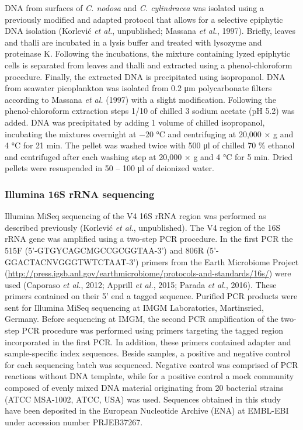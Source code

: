 \documentclass[12pt,]{article}
\begin{document}
DNA from surfaces of \emph{C. nodosa} and \emph{C. cylindracea} was
isolated using a previously modified and adapted protocol that allows
for a selective epiphytic DNA isolation (Korlević \emph{et al.},
unpublished; Massana \emph{et al.}, 1997). Briefly, leaves and thalli
are incubated in a lysis buffer and treated with lysozyme and proteinase
K. Following the incubations, the mixture containing lyzed epiphytic
cells is separated from leaves and thalli and extracted using a
phenol-chloroform procedure. Finally, the extracted DNA is precipitated
using isopropanol. DNA from seawater picoplankton was isolated from 0.2
\si{\um} polycarbonate filters according to Massana \emph{et al.} (1997)
with a slight modification. Following the phenol-chloroform extraction
steps 1/10 of chilled 3 \si{\Molar} sodium acetate (pH 5.2) was added.
DNA was precipitated by adding 1 volume of chilled isopropanol,
incubating the mixtures overnight at \num{-20} \si{\degreeCelsius} and
centrifuging at 20,000 × g and 4 \si{\degreeCelsius} for 21
\si{\minute}. The pellet was washed twice with 500 \si{\ul} of chilled
70 \si{\percent} ethanol and centrifuged after each washing step at
20,000 × g and 4 \si{\degreeCelsius} for 5 \si{\minute}. Dried pellets
were resuspended in 50 -- 100 \si{\ul} of deionized water.

\hypertarget{illumina-16s-rrna-sequencing}{%
\subsubsection{Illumina 16S rRNA
sequencing}\label{illumina-16s-rrna-sequencing}}

Illumina MiSeq sequencing of the V4 16S rRNA region was performed as
described previously (Korlević \emph{et al.}, unpublished). The V4
region of the 16S rRNA gene was amplified using a two-step PCR
procedure. In the first PCR the 515F (5'-GTGYCAGCMGCCGCGGTAA-3') and
806R (5'-GGACTACNVGGGTWTCTAAT-3') primers from the Earth Microbiome
Project
(\url{http://press.igsb.anl.gov/earthmicrobiome/protocols-and-standards/16s/})
were used (Caporaso \emph{et al.}, 2012; Apprill \emph{et al.}, 2015;
Parada \emph{et al.}, 2016). These primers contained on their 5' end a
tagged sequence. Purified PCR products were sent for Illumina MiSeq
sequencing at IMGM Laboratories, Martinsried, Germany. Before sequencing
at IMGM, the second PCR amplification of the two-step PCR procedure was
performed using primers targeting the tagged region incorporated in the
first PCR. In addition, these primers contained adapter and
sample-specific index sequences. Beside samples, a positive and negative
control for each sequencing batch was sequenced. Negative control was
comprised of PCR reactions without DNA template, while for a positive
control a mock community composed of evenly mixed DNA material
originating from 20 bacterial strains (ATCC MSA-1002, ATCC, USA) was
used. Sequences obtained in this study have been deposited in the
European Nucleotide Archive (ENA) at EMBL-EBI under accession number
PRJEB37267.
\end{document}
